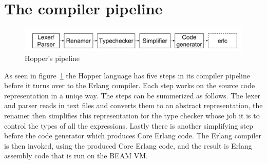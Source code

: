\section{The compiler pipeline}




\begin{figure}[h!]
\centering
  \includegraphics[width=0.6\pdfpagewidth]{figure/pipeline}
  \caption{Hopper's pipeline}
  \label{fig:pipeline}
\end{figure}


As seen in figure~\ref{fig:pipeline} the Hopper language has five steps in its compiler
pipeline before it turns over to the Erlang compiler. Each step works on the 
source code representation in a uniqe way. The steps can be summerized as
follows. The lexer and parser reads in text files and converts them to an 
abstract representation, the renamer then simplifies this representation for the 
type checker whose job it is to control the types of all the expressions. Lastly 
there is another simplifying step before the code generator which produces Core
Erlang code. The Erlang compiler is then invoked, using the produced Core Erlang
code, and the result is Erlang assembly code that is run on the BEAM VM.
